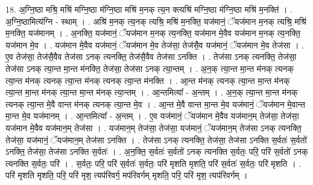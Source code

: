 \documentclass[17pt]{extarticle}
\begin{document}
18. अ॒ग्नि॒ष्ठा मश्रि॒ मश्रि॑ मग्नि॒ष्ठा म॑ग्नि॒ष्ठा मश्रि॑ म॒नक् त्य॒न क्त्यश्रि॑ मग्नि॒ष्ठा म॑ग्नि॒ष्ठा मश्रि॑ म॒नक्ति॑ । . अ॒ग्नि॒ष्ठामित्य॑ग्नि - स्थाम् । . अश्रि॑ म॒नक् त्य॒नक् त्यश्रि॒ मश्रि॑ म॒नक्ति॒ यज॑मानं॒ ॅयज॑मान म॒नक् त्यश्रि॒ मश्रि॑ म॒नक्ति॒ यज॑मानम् । . अ॒नक्ति॒ यज॑मानं॒ ॅयज॑मान म॒नक् त्य॒नक्ति॒ यज॑मान मे॒वैव यज॑मान म॒नक् त्य॒नक्ति॒ यज॑मान मे॒व । . यज॑मान मे॒वैव यज॑मानं॒ ॅयज॑मान मे॒व तेज॑सा॒ तेज॑सै॒व यज॑मानं॒ ॅयज॑मान मे॒व तेज॑सा । . ए॒व तेज॑सा॒ तेज॑सै॒वैव तेज॑सा ऽनक् त्यनक्ति॒ तेज॑सै॒वैव तेज॑सा ऽनक्ति । . तेज॑सा ऽनक् त्यनक्ति॒ तेज॑सा॒ तेज॑सा ऽनक् त्या॒न्त मा॒न्त म॑नक्ति॒ तेज॑सा॒ तेज॑सा ऽनक् त्या॒न्तम् । . अ॒न॒क् त्या॒न्त मा॒न्त म॑नक् त्यनक् त्या॒न्त म॑नक् त्यनक् त्या॒न्त म॑नक् त्यनक् त्या॒न्त म॑नक्ति । . आ॒न्त म॑नक् त्यनक् त्या॒न्त मा॒न्त म॑नक् त्या॒न्त मा॒न्त म॑नक् त्या॒न्त मा॒न्त म॑नक् त्या॒न्तम् । . आ॒न्तमित्या᳚ - अ॒न्तम् । . अ॒न॒क् त्या॒न्त मा॒न्त म॑नक् त्यनक् त्या॒न्त मे॒वै वान्त म॑नक् त्यनक् त्या॒न्त मे॒व । . आ॒न्त मे॒वै वान्त मा॒न्त मे॒व यज॑मानं॒ ॅयज॑मान मे॒वान्त मा॒न्त मे॒व यज॑मानम् । . आ॒न्तमित्या᳚ - अ॒न्तम् । . ए॒व यज॑मानं॒ ॅयज॑मान मे॒वैव यज॑मान॒म् तेज॑सा॒ तेज॑सा॒ यज॑मान मे॒वैव यज॑मान॒म् तेज॑सा । . यज॑मान॒म् तेज॑सा॒ तेज॑सा॒ यज॑मानं॒ ॅयज॑मान॒म् तेज॑सा ऽनक् त्यनक्ति॒ तेज॑सा॒ यज॑मानं॒ ॅयज॑मान॒म् तेज॑सा ऽनक्ति । . तेज॑सा ऽनक् त्यनक्ति॒ तेज॑सा॒ तेज॑सा ऽनक्ति स॒र्वतः॑ स॒र्वतो॑ ऽनक्ति॒ तेज॑सा॒ तेज॑सा ऽनक्ति स॒र्वतः॑ । . अ॒न॒क्ति॒ स॒र्वतः॑ स॒र्वतो॑ ऽनक् त्यनक्ति स॒र्वतः॒ परि॒ परि॑ स॒र्वतो॑ ऽनक् त्यनक्ति स॒र्वतः॒ परि॑ । . स॒र्वतः॒ परि॒ परि॑ स॒र्वतः॑ स॒र्वतः॒ परि॑ मृशति मृशति॒ परि॑ स॒र्वतः॑ स॒र्वतः॒ परि॑ मृशति । . परि॑ मृशति मृशति॒ परि॒ परि॑ मृश॒ त्यप॑रिवर्ग॒ मप॑रिवर्गम् मृशति॒ परि॒ परि॑ मृश॒ त्यप॑रिवर्गम् । \newline
\end{document}
